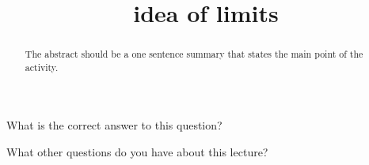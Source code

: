 \documentclass{ximera}
\title{idea of limits}
\begin{document}
\begin{abstract}
  The abstract should be a one sentence summary that states the main point of the activity.
\end{abstract}

\maketitle

\begin{question}
  What is the correct answer to this question?

  \begin{solution}
    \begin{multiple-choice}
    \end{multiple-choice}  
  \end{solution}
\end{question}

What other questions do you have about this lecture?
\begin{free-response}
\end{free-response}
\end{document}
